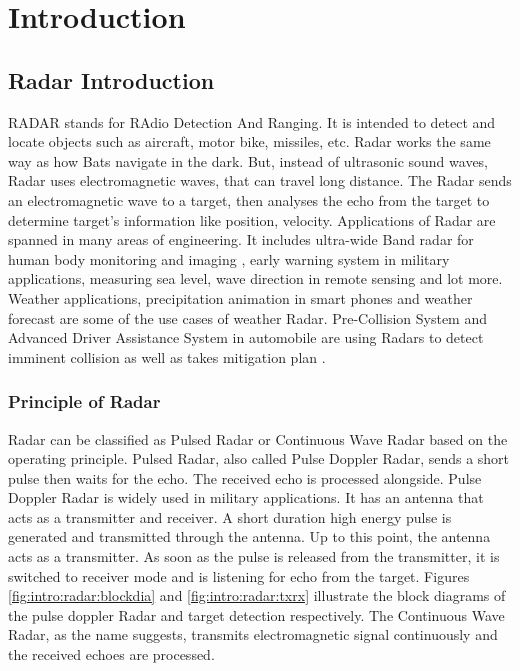 \chapter{Introduction}
\label{chap:introduction}

\section{Radar Introduction}
\label{sec:intro:radarintroduction}
RADAR stands for RAdio Detection And Ranging. It is intended to detect and locate objects such as aircraft, motor bike, missiles, etc. Radar works the same way as how Bats navigate in the dark. But, instead of ultrasonic sound waves, Radar uses electromagnetic waves, that can travel long distance. The Radar sends an electromagnetic wave to a target, then analyses the echo from the target to determine target's information like position, velocity. Applications of Radar are spanned in many areas of engineering. It includes ultra-wide Band radar for human body monitoring and imaging \cite{radarMedi}, early warning system in military applications, measuring sea level, wave direction in remote sensing and lot more. Weather applications, precipitation animation in smart phones and weather forecast are some of the use cases of weather Radar. Pre-Collision System and Advanced Driver Assistance System in automobile are using Radars to detect imminent collision as well as takes mitigation plan \cite{radarCollAvoid}.

\subsection{Principle of Radar}
\label{sec:intro:principleofradar}
Radar can be classified as Pulsed Radar or Continuous Wave Radar based on the operating principle\cite{radarTypes}. Pulsed Radar, also called Pulse Doppler Radar, sends a short pulse then waits for the echo. The received echo is processed alongside. Pulse Doppler Radar is widely used in military applications. It has an antenna that acts as a transmitter and receiver. A short duration high energy pulse is generated and transmitted through the antenna. Up to this point, the antenna acts as a transmitter. As soon as the pulse is released from the transmitter, it is switched to receiver mode and is listening for echo from the target. Figures \ref{fig:intro:radar:blockdia} and \ref{fig:intro:radar:txrx} illustrate the block diagrams of the pulse doppler Radar and target detection respectively. The Continuous Wave Radar, as the name suggests, transmits electromagnetic signal continuously and the received echoes are processed.

